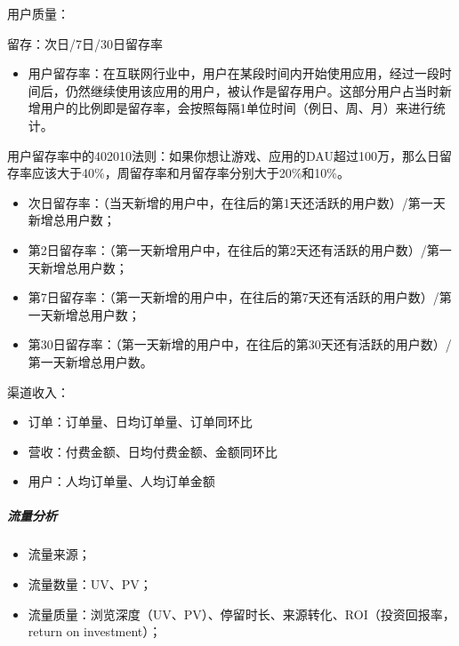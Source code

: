 \documentclass[letterpaper,11pt,english]{sphinxmanual}
\begin{document}
用户质量：

留存：次日/7日/30日留存率
\begin{itemize}
\item {} 
用户留存率：在互联网行业中，用户在某段时间内开始使用应用，经过一段时间后，仍然继续使用该应用的用户，被认作是留存用户。这部分用户占当时新增用户的比例即是留存率，会按照每隔1单位时间（例日、周、月）来进行统计。

\end{itemize}

用户留存率中的40\sphinxhyphen{}20\sphinxhyphen{}10法则：如果你想让游戏、应用的DAU超过100万，那么日留存率应该大于40\%，周留存率和月留存率分别大于20\%和10\%。
\begin{itemize}
\item {} 
次日留存率：（当天新增的用户中，在往后的第1天还活跃的用户数）/第一天新增总用户数；

\item {} 
第2日留存率：（第一天新增用户中，在往后的第2天还有活跃的用户数）/第一天新增总用户数；

\item {} 
第7日留存率：（第一天新增的用户中，在往后的第7天还有活跃的用户数）/第一天新增总用户数；

\item {} 
第30日留存率：（第一天新增的用户中，在往后的第30天还有活跃的用户数）/第一天新增总用户数。

\end{itemize}

渠道收入：
\begin{itemize}
\item {} 
订单：订单量、日均订单量、订单同环比

\item {} 
营收：付费金额、日均付费金额、金额同环比

\item {} 
用户：人均订单量、人均订单金额

\end{itemize}


\subparagraph{流量分析}
\label{\detokenize{chapter_skill/data_analysis:id6}}\begin{itemize}
\item {} 
流量来源；

\item {} 
流量数量：UV、PV；

\item {} 
流量质量：浏览深度（UV、PV）、停留时长、来源转化、ROI（投资回报率，return
on investment）；

\end{itemize}
\end{document}
